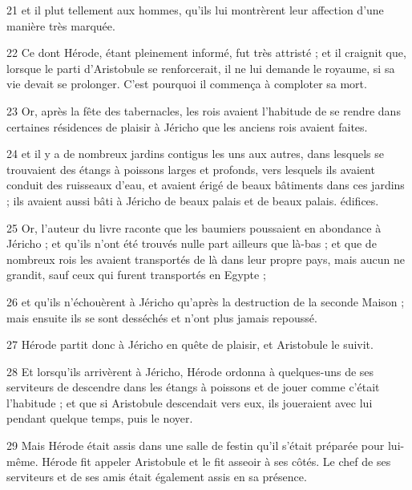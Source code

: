\par 21 et il plut tellement aux hommes, qu'ils lui montrèrent leur affection d'une manière très marquée.

\par 22 Ce dont Hérode, étant pleinement informé, fut très attristé ; et il craignit que, lorsque le parti d'Aristobule se renforcerait, il ne lui demande le royaume, si sa vie devait se prolonger. C'est pourquoi il commença à comploter sa mort.

\par 23 Or, après la fête des tabernacles, les rois avaient l'habitude de se rendre dans certaines résidences de plaisir à Jéricho que les anciens rois avaient faites.

\par 24 et il y a de nombreux jardins contigus les uns aux autres, dans lesquels se trouvaient des étangs à poissons larges et profonds, vers lesquels ils avaient conduit des ruisseaux d'eau, et avaient érigé de beaux bâtiments dans ces jardins ; ils avaient aussi bâti à Jéricho de beaux palais et de beaux palais. édifices.

\par 25 Or, l'auteur du livre raconte que les baumiers poussaient en abondance à Jéricho ; et qu'ils n'ont été trouvés nulle part ailleurs que là-bas ; et que de nombreux rois les avaient transportés de là dans leur propre pays, mais aucun ne grandit, sauf ceux qui furent transportés en Egypte ;

\par 26 et qu'ils n'échouèrent à Jéricho qu'après la destruction de la seconde Maison ; mais ensuite ils se sont desséchés et n'ont plus jamais repoussé.

\par 27 Hérode partit donc à Jéricho en quête de plaisir, et Aristobule le suivit.

\par 28 Et lorsqu'ils arrivèrent à Jéricho, Hérode ordonna à quelques-uns de ses serviteurs de descendre dans les étangs à poissons et de jouer comme c'était l'habitude ; et que si Aristobule descendait vers eux, ils joueraient avec lui pendant quelque temps, puis le noyer.

\par 29 Mais Hérode était assis dans une salle de festin qu'il s'était préparée pour lui-même. Hérode fit appeler Aristobule et le fit asseoir à ses côtés. Le chef de ses serviteurs et de ses amis était également assis en sa présence.

